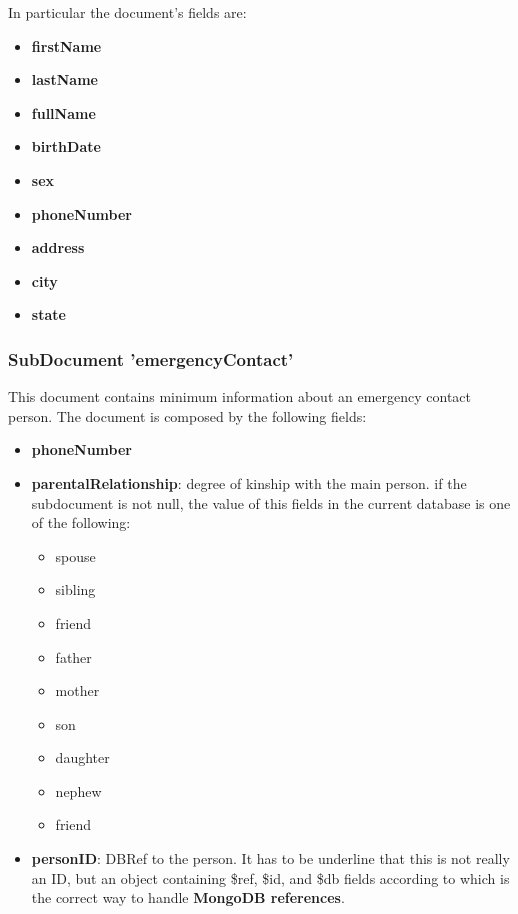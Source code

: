 \documentclass{article}[IEEEtran]
\begin{document}
In particular the document's fields are:

\begin{itemize}
    \item \textbf{firstName}
    \item \textbf{lastName}
    \item \textbf{fullName}
    \item \textbf{birthDate}
    \item \textbf{sex}
    \item \textbf{phoneNumber} 
    \item \textbf{address}
    \item \textbf{city}
    \item \textbf{state}
\end{itemize}

\subsubsection{SubDocument 'emergencyContact'}

This document contains minimum information about an emergency contact person. The document is composed by the following fields:

\begin{itemize}

    \item \textbf{phoneNumber}
    \item \textbf{parentalRelationship}: degree of kinship with the main person. if the subdocument is not null, the value of this fields in the current database is one of the following: 
    \begin{itemize}
        \item spouse
        \item sibling
        \item friend
        \item father
        \item mother
        \item son
        \item daughter
        \item nephew
        \item friend
    \end{itemize}
    
    \item \textbf{personID}: DBRef to the person. It has to be underline that this is not really an ID, but an object containing \$ref, \$id, and \$db fields according to which is the correct way to handle \textbf{MongoDB references}\cite{mongodbreferences}.
    
\end{itemize}
\end{document}
